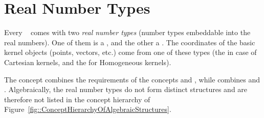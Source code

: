 \section{Real Number Types}
Every \cgal\  comes with two \emph{real number types}
(number types embeddable into the real numbers). One of them is a
, and the other a .  The
coordinates of the basic kernel objects (points, vectors, etc.) come
from one of these types (the  in case of Cartesian
kernels, and the  for Homogeneous kernels). 

The concept  combines the requirements of the
concepts  and , while
 combines  and
. Algebraically, the real number types do not form
distinct structures and are therefore not listed in the concept
hierarchy of Figure~\ref{fig::ConceptHierarchyOfAlgebraicStructures}.
